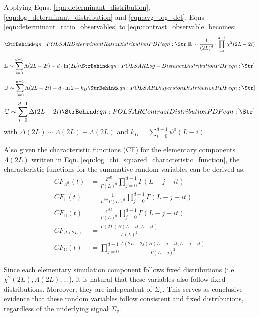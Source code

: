 Applying Eqns. \ref{eqn:determinant_distribution}, \ref{eqn:log_determinant_distribution} and \ref{eqn:avg_log_det}, Eqns \ref{eqn:determinant_ratio_observables} to \ref{eqn:contrast_observable} becomes:
\begin{equation}
 \label{eqn:determinant_ratio_distribution}
 \caption{eqn:POLSAR Determinant Ratio Distribution PDF}
 \mathbb{R} \sim \frac{1}{(2L)^d} \cdot \prod_{i=0}^{d-1} \chi^2 (2L-2i) 
\end{equation}
\begin{equation}
\mathbb{L} \sim  \sum^{d-1}_{i=0} \Lambda(2L-2i) - d \cdot \ln(2L)
\label{eqn:log_determinant_distance_distribution}  
 \caption{eqn:POLSAR Log-Distance Distribution PDF}
\end{equation}
\begin{equation}
 \mathbb{D} \sim \sum^{d-1}_{i=0} \Lambda(2L-2i) - d \cdot \ln{2} + k_D
\label{eqn:dispersion_distribution}  
 \caption{eqn:POLSAR Dispersion Distribution PDF}
\end{equation}
\begin{equation}
 \mathbb{C} \sim \sum^{d-1}_{i=0} \Delta(2L-2i)
\label{eqn:contrast_distribution}  
 \caption{eqn:POLSAR Contrast Distribution PDF}
\end{equation}
with $\Delta(2L) \sim \Lambda(2L) - \Lambda(2L)$
and $k_D=\sum^{d-1}_{i=0} \psi^0(L-i)$

Also given the characteristic functions (CF) for the elementary components $\Lambda(2L)$ written in Eqn. \ref{eqn:log_chi_squared_characteristic_function}, 
  the characteristic functions for the summative random variables can be derived as:
\begin{align}
  CF_{\Lambda^d_L}(t) &= \frac{2^{idt}}{\Gamma(L)^d} \prod^{d-1}_{j=0} \Gamma(L-j+it) \\
  CF_{\mathbb{L}}(t) &= \frac{1}{L^{idt} \Gamma(L)^d} \prod^{d-1}_{j=0} \Gamma(L-j+it) \\
  CF_{\mathbb{D}}(t) &= \frac{e^{ikt}}{\Gamma(L)^d} \prod^{d-1}_{j=0} \Gamma(L-j+it) \\
  CF_{\Delta(2L)} &= \frac{\Gamma(2L) B(L-it,L+it)}{\Gamma(L)^2} \\
  CF_{\mathbb{C}}(t) &=  \prod^{d-1}_{j=0} \frac{\Gamma(2L-2j) B(L-j-it,L-j+it)}{\Gamma(L-j)^2}
\end{align}

Since each elementary simulation component follows fixed distributions (i.e. $\chi^2(2L), \Lambda(2L), ... $),
  it is natural that these variables also follow fixed distributions.
Moreover, they are independent of $\Sigma_v$.
This serves as conclusive evidence that
  these random variables follow consistent and fixed distributions,
  regardless of the underlying signal $\Sigma_v$.

